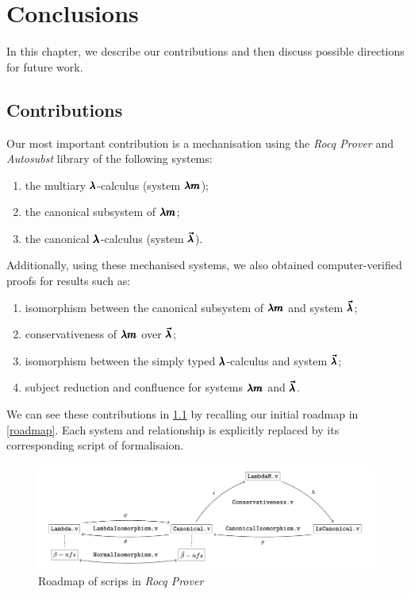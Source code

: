\chapter{Conclusions}
\label{c:conclusions}

In this chapter, we describe our contributions and then discuss possible directions for future work.

\section{Contributions}


Our most important contribution is a mechanisation using the \textit{Rocq Prover} and \textit{Autosubst} library of the following systems:
\begin{enumerate}
\item the multiary $\pmb{\lambda}$-calculus (system $\pmb{\lambda m}$);
\item the canonical subsystem of $\pmb{\lambda m}$;
\item the canonical $\pmb{\lambda}$-calculus (system $\pmb{\vec \lambda}$).
\end{enumerate}


Additionally, using these mechanised systems, we also obtained computer-verified proofs for results such as:
\begin{enumerate}
\item isomorphism between the canonical subsystem of $\pmb{\lambda m}$ and system $\pmb{\vec \lambda}$;
\item conservativeness of $\pmb{\lambda m}$ over $\pmb{\vec \lambda}$;
\item isomorphism between the simply typed $\pmb{\lambda}$-calculus and system $\pmb{\vec \lambda}$;
\item subject reduction and confluence for systems $\pmb{\lambda m}$ and $\pmb{\vec \lambda}$.
\end{enumerate}

We can see these contributions in \cref{scripts_roadmap} by recalling our initial roadmap in \cref{roadmap}.
Each system and relationship is explicitly replaced by its corresponding script of formalisaion.

\begin{figure}[h]
  \centering
  \includegraphics[width=1\textwidth]{pictures/scripts_roadmap}
  \caption{Roadmap of scrips in \textit{Rocq Prover}} \label{scripts_roadmap}
\end{figure}


